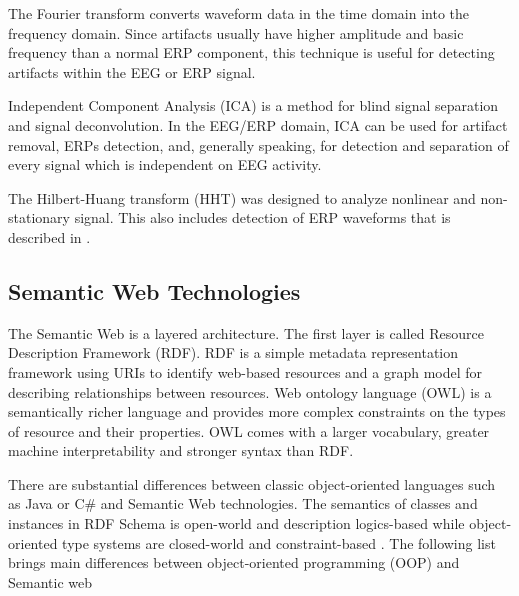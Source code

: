 \documentclass[a4paper,twoside]{article}
\begin{document}
The Fourier transform converts waveform data in the time domain into the frequency domain. Since artifacts usually have higher amplitude and basic frequency than a normal ERP component, this technique is useful for detecting artifacts within the EEG or ERP signal.

Independent Component Analysis (ICA) \cite{Hyv01} is a method for blind signal separation and signal deconvolution. In the EEG/ERP domain, ICA can be used for artifact removal, ERPs detection, and, generally speaking, for detection and separation of every signal which is independent on EEG activity.

The  Hilbert-Huang  transform  (HHT)  was  designed  to  analyze  nonlinear  and  non-stationary signal. This also includes detection of ERP waveforms that is described in \cite{Ciniburk11}.

\subsection{Semantic Web Technologies}

\noindent The Semantic Web is a layered architecture. The first layer is called Resource Description Framework (RDF). RDF is a simple metadata representation framework using URIs to identify web-based resources and a graph model for describing relationships between resources. Web ontology language (OWL) is a semantically richer language and provides more complex constraints on the types of resource and their properties. OWL comes with a larger vocabulary, greater machine interpretability and stronger syntax than RDF.

There are substantial differences between classic object-oriented languages such as Java or C\# and Semantic Web technologies. The semantics of classes and instances in RDF Schema is open-world and description logics-based while object-oriented type systems are closed-world and constraint-based \cite{Kalyanpur02}. The following list brings main differences between object-oriented programming (OOP) and Semantic web \cite{Oren07}
\end{document}
